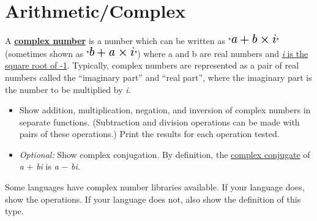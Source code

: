 \pagebreak{}
\section*{Arithmetic/Complex}

A \textbf{\href{http://en.wikipedia.org/wiki/Complex\_number}{complex
number}} is a number which can be written as
"\includegraphics[scale=.6]{graphics/af18dab590e0f994693fc34b6803c1e1.png}"
(sometimes shown as
"\includegraphics[scale=.6]{graphics/1465b5194836899e7331a9fcf9cda03e.png}")
where a and b are real numbers and
\href{http://en.wikipedia.org/wiki/Imaginary\_unit}{\emph{i} is the
square root of -1}. Typically, complex numbers are represented as a pair
of real numbers called the ``imaginary part'' and ``real part'', where
the imaginary part is the number to be multiplied by \emph{i}.

\begin{itemize}
\item
  Show addition, multiplication, negation, and inversion of complex
  numbers in separate functions. (Subtraction and division operations
  can be made with pairs of these operations.) Print the results for
  each operation tested.
\item
  \emph{Optional:} Show complex conjugation. By definition, the
  \href{http://en.wikipedia.org/wiki/complex\_conjugate}{complex
  conjugate} of \emph{a} + \emph{b}\emph{i} is \emph{a} −
  \emph{b}\emph{i}.
\end{itemize}

Some languages have complex number libraries available. If your language
does, show the operations. If your language does not, also show the
definition of this type.


